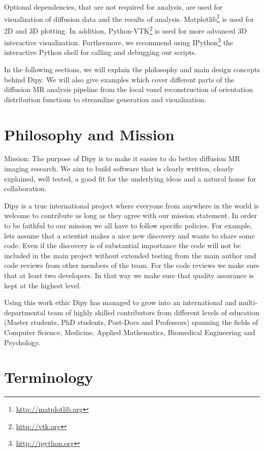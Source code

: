 \documentclass{bioinfo}
\begin{document}
Optional dependencies, that are not required for analysis, are used for visualization of diffusion data and the results of analysis. Matplotlib\footnote{\url{http://matplotlib.org}} is used for 2D and 3D plotting. In addition, Python-VTK\footnote{\url{http://vtk.org}} is used for more advanced 3D interactive visualization. Furthermore, we recommend using IPython\footnote{\url{http://ipython.org}} the interactive Python shell for calling and debugging our scripts. 

In the following sections, we will explain the philosophy and main design concepts behind Dipy. We will also give examples which cover different parts of the diffusion MR analysis pipeline from the local voxel reconstruction of orientation distribution functions to streamline generation and visualization. 

\section{Philosophy and Mission}

Mission: The purpose of Dipy is to make it easier to do better diffusion MR imaging research. We aim to build software that is clearly written, clearly explained, well tested, a good fit for the underlying ideas and a natural home for collaboration.

Dipy is a true international project where everyone from anywhere in the world is welcome to contribute as long as they agree with our mission statement. In order to be faithful to our mission we all have to follow specific policies. For example, lets assume that a scientist makes a nice new discovery and wants to share some code. Even if the discovery is of substantial importance the code will not be included in the main project without extended testing from the main author and code reviews from other members of the team. For the code reviews we make sure that at least two developers. In that way we make sure that quality assurance is kept at the highest level. 

Using this work ethic Dipy has managed to grow into an international and multi-departmental team of highly skilled contributors from different levels of education (Master students, PhD students, Post-Docs and Professors) spanning the fields of Computer Science, Medicine, Applied Mathematics, Biomedical Engineering and Psychology. 


\section{Terminology}
\end{document}
